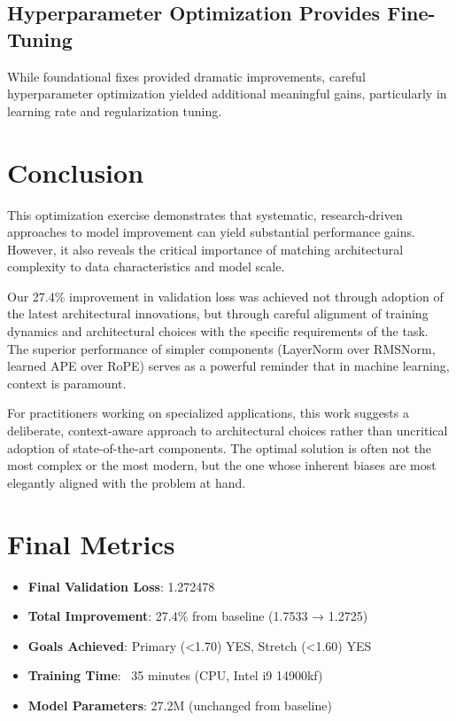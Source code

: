 \documentclass[11pt,a4paper]{article}
\begin{document}
\subsection{Hyperparameter Optimization Provides Fine-Tuning}
While foundational fixes provided dramatic improvements, careful hyperparameter optimization yielded additional meaningful gains, particularly in learning rate and regularization tuning.

\section{Conclusion}

This optimization exercise demonstrates that systematic, research-driven approaches to model improvement can yield substantial performance gains. However, it also reveals the critical importance of matching architectural complexity to data characteristics and model scale.

Our 27.4\% improvement in validation loss was achieved not through adoption of the latest architectural innovations, but through careful alignment of training dynamics and architectural choices with the specific requirements of the task. The superior performance of simpler components (LayerNorm over RMSNorm, learned APE over RoPE) serves as a powerful reminder that in machine learning, context is paramount.

For practitioners working on specialized applications, this work suggests a deliberate, context-aware approach to architectural choices rather than uncritical adoption of state-of-the-art components. The optimal solution is often not the most complex or the most modern, but the one whose inherent biases are most elegantly aligned with the problem at hand.

\section*{Final Metrics}
\begin{itemize}
    \item \textbf{Final Validation Loss}: 1.272478
    \item \textbf{Total Improvement}: 27.4\% from baseline (1.7533 → 1.2725)
    \item \textbf{Goals Achieved}: Primary (<1.70) YES, Stretch (<1.60) YES
    \item \textbf{Training Time}: ~35 minutes (CPU, Intel i9 14900kf)
    \item \textbf{Model Parameters}: 27.2M (unchanged from baseline)
\end{itemize}
\end{document}

